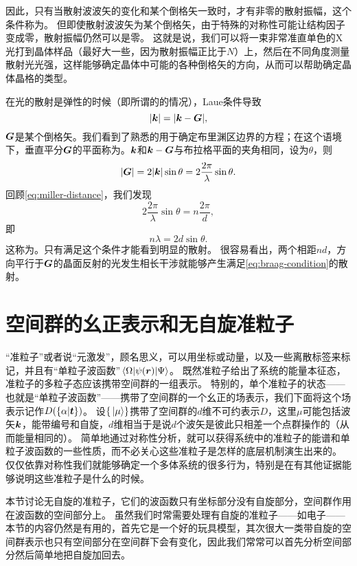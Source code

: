 因此，只有当散射波波矢的变化和某个倒格矢一致时，才有非零的散射振幅，这个条件称为。
但即使散射波波矢为某个倒格矢，由于特殊的对称性可能让结构因子变成零，散射振幅仍然可以是零。
这就是说，我们可以将一束非常准直单色的X光打到晶体样品（最好大一些，因为散射振幅正比于$N$）上，然后在不同角度测量散射光光强，这样能够确定晶体中可能的各种倒格矢的方向，从而可以帮助确定晶体晶格的类型。

在光的散射是弹性的时候（即所谓的的情况），Laue条件导致
\[
    \abs{\vb*{k}} = \abs{\vb*{k} - \vb*{G}},
\]
$\vb*{G}$是某个倒格矢。我们看到了熟悉的用于确定布里渊区边界的方程；在这个语境下，垂直平分$\vb*{G}$的平面称为。$\vb*{k}$和$\vb*{k} - \vb*{G}$与布拉格平面的夹角相同，设为$\theta$，则
\[
    \abs{\vb*{G}} = 2 \abs{\vb*{k}} \sin \theta = 2 \frac{2\pi}{\lambda} \sin \theta.
\]
回顾\eqref{eq:miller-distance}，我们发现
\[
    2 \frac{2\pi}{\lambda} \sin \theta = n \frac{2\pi}{d}, 
\]
即
\begin{equation}
    n \lambda = 2 d \sin \theta.
    \label{eq:braag-condition}
\end{equation}
这称为。只有满足这个条件才能看到明显的散射。
很容易看出，两个相距$nd$，方向平行于$\vb*{G}$的晶面反射的光发生相长干涉就能够产生满足\eqref{eq:braag-condition}的散射。

\section{空间群的幺正表示和无自旋准粒子}

“准粒子”或者说“元激发”，顾名思义，可以用坐标或动量，以及一些离散标签来标记，并且有“单粒子波函数”$\mel{\Omega}{\psi(\vb*{r})}{\Psi}$。
既然准粒子给出了系统的能量本征态，准粒子的多粒子态应该携带空间群的一组表示。
特别的，单个准粒子的状态——也就是“单粒子波函数”——携带了空间群的一个幺正的场表示，我们下面将这个场表示记作$D(\{\alpha | \vb*{t}\})$。
设$\{\ket*{\mu}\}$携带了空间群的$d$维不可约表示$D$，这里$\mu$可能包括波矢$\vb*{k}$，能带编号和自旋，$d$维相当于是说$d$个波矢是彼此只相差一个点群操作的（从而能量相同的）。
简单地通过对称性分析，就可以获得系统中的准粒子的能谱和单粒子波函数的一些性质，而不必关心这些准粒子是怎样的底层机制演生出来的。
仅仅依靠对称性我们就能够确定一个多体系统的很多行为，特别是在有其他证据能够说明这些准粒子是什么的时候。

本节讨论无自旋的准粒子，它们的波函数只有坐标部分没有自旋部分，空间群作用在波函数的空间部分上。
虽然我们时常需要处理有自旋的准粒子——如电子——本节的内容仍然是有用的，首先它是一个好的玩具模型，其次很大一类带自旋的空间群表示也只有空间部分在空间群下会有变化，因此我们常常可以首先分析空间部分然后简单地把自旋加回去。

